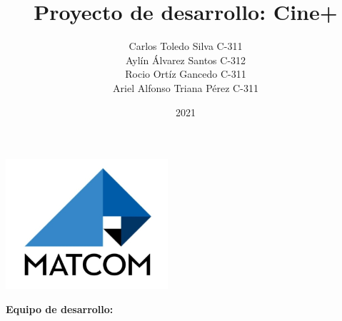 \documentclass[letterpaper,12pt, oneside, onecolumn, openany]{book}
\begin{document}
\author{Carlos Toledo Silva		C-311\\Aylín Álvarez Santos		C-312\\Rocio Ortíz Gancedo		C-311\\Ariel Alfonso Triana Pérez 		C-311}
\title{Proyecto de desarrollo: Cine+}
\date{2021}

\makeatletter

\begin{titlepage}
\centering

\vspace{5cm}

{ \Huge \textbf{\@title}}

\vspace{5cm}

\includegraphics[width=6cm]{./chapters/img/logo-matcom.jpg}

\vspace{5cm}

\textbf{Equipo de desarrollo:}

 \@author

\vspace{1cm}

\@date
\end{titlepage}

\tableofcontents


\mainmatter








\backmatter

\end{document}
